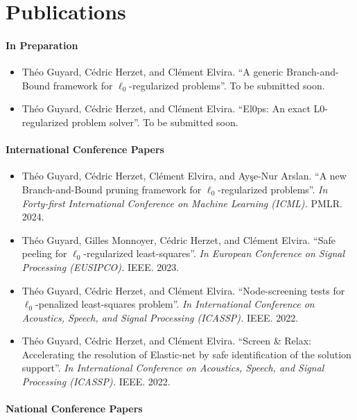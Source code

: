 \section{Publications}

\paragraph*{In Preparation}

\begin{itemize}[nosep]
    \item Théo Guyard, Cédric Herzet, and Clément Elvira. ``A generic Branch-and-Bound framework for $\ell_0$-regularized problems''. To be submitted soon.
    \item Théo Guyard, Cédric Herzet, and Clément Elvira. ``El0ps: An exact L0-regularized problem solver''. To be submitted soon.
\end{itemize}

\paragraph*{International Conference Papers}

\begin{itemize}
    \item Théo Guyard, Cédric Herzet, Clément Elvira, and Ay\c{s}e-Nur Arslan. ``A new Branch-and-Bound pruning framework for $\ell_0$-regularized problems''. \textit{In Forty-first International Conference on Machine Learning (ICML).} PMLR. 2024.
    \item Théo Guyard, Gilles Monnoyer, Cédric Herzet,  and Clément Elvira. ``Safe peeling for $\ell_0$-regularized least-squares''. \textit{In European Conference on Signal Processing (EUSIPCO).} IEEE. 2023.
    \item Théo Guyard, Cédric Herzet, and Clément Elvira. ``Node-screening tests for $\ell_0$-penalized least-squares problem''. \textit{In International Conference on Acoustics, Speech, and Signal Processing (ICASSP).} IEEE. 2022.
    \item Théo Guyard, Cédric Herzet, and Clément Elvira. ``Screen \& Relax: Accelerating the resolution of Elastic-net by safe identification of the solution support''. \textit{In International Conference on Acoustics, Speech, and Signal Processing (ICASSP).} IEEE. 2022.
\end{itemize}

\paragraph*{National Conference Papers}

